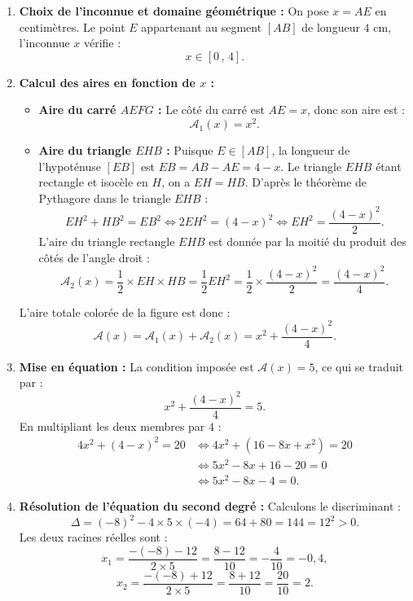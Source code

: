 \documentclass[11pt,a4paper]{article}
\begin{document}
\begin{correctionbox}
\begin{enumerate}
    \item \textbf{Choix de l'inconnue et domaine géométrique :}
    On pose $x = AE$ en centimètres.
    Le point $E$ appartenant au segment $[AB]$ de longueur $4\text{ cm}$, l'inconnue $x$ vérifie :
    \[
    x \in [0\,,\, 4].
    \]

    \item \textbf{Calcul des aires en fonction de $x$ :}
    \begin{itemize}
        \item \textbf{Aire du carré $AEFG$ :}
        Le côté du carré est $AE = x$, donc son aire est :
        \[
        \mathcal{A}_1(x) = x^2.
        \]
        \item \textbf{Aire du triangle $EHB$ :}
        Puisque $E \in [AB]$, la longueur de l'hypoténuse $[EB]$ est $EB = AB - AE = 4 - x$.
        Le triangle $EHB$ étant rectangle et isocèle en $H$, on a $EH = HB$. D'après le théorème de Pythagore dans le triangle $EHB$ :
        \[
        EH^2 + HB^2 = EB^2 \iff 2 EH^2 = (4-x)^2 \iff EH^2 = \frac{(4-x)^2}{2}.
        \]
        L'aire du triangle rectangle $EHB$ est donnée par la moitié du produit des côtés de l'angle droit :
        \[
        \mathcal{A}_2(x) = \frac{1}{2} \times EH \times HB = \frac{1}{2} EH^2 = \frac{1}{2} \times \frac{(4-x)^2}{2} = \frac{(4-x)^2}{4}.
        \]
    \end{itemize}
    L'aire totale colorée de la figure est donc :
    \[
    \mathcal{A}(x) = \mathcal{A}_1(x) + \mathcal{A}_2(x) = x^2 + \frac{(4-x)^2}{4}.
    \]

    \item \textbf{Mise en équation :}
    La condition imposée est $\mathcal{A}(x) = 5$, ce qui se traduit par :
    \[
    x^2 + \frac{(4-x)^2}{4} = 5.
    \]
    En multipliant les deux membres par $4$ :
    \begin{align*}
    4x^2 + (4-x)^2 = 20 &\iff 4x^2 + (16 - 8x + x^2) = 20 \\
    &\iff 5x^2 - 8x + 16 - 20 = 0 \\
    &\iff 5x^2 - 8x - 4 = 0.
    \end{align*}

    \item \textbf{Résolution de l'équation du second degré :}
    Calculons le discriminant :
    \[
    \Delta = (-8)^2 - 4 \times 5 \times (-4) = 64 + 80 = 144 = 12^2 > 0.
    \]
    Les deux racines réelles sont :
    \[
    x_1 = \frac{-(-8) - 12}{2 \times 5} = \frac{8 - 12}{10} = -\frac{4}{10} = -0{,}4,
    \]
    \[
    x_2 = \frac{-(-8) + 12}{2 \times 5} = \frac{8 + 12}{10} = \frac{20}{10} = 2.
    \]


\end{enumerate}
\end{correctionbox}
\end{document}
